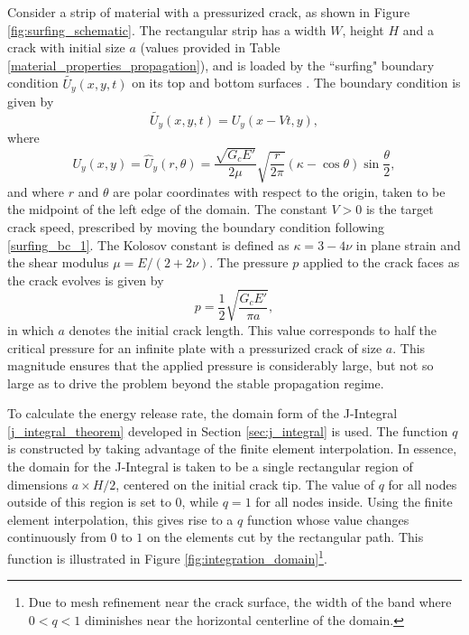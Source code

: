 
Consider a strip of material with a pressurized crack, as shown in  Figure \ref{fig:surfing_schematic}.
The rectangular strip has a width $W$, height $H$ and a crack with initial size $a$ (values provided in Table \ref{material_properties_propagation}), and is loaded by the ``surfing" boundary condition $\widetilde{U_y}(x,y,t)$ on its top and bottom surfaces \cite{hossain2014effective}. The boundary condition is given by
\begin{equation}\label{surfing_bc_1}
    \widetilde{U_y}(x,y,t) = U_y(x-Vt,y),  
\end{equation}
where
\begin{equation}\label{surfing_bc_2}
    U_y(x,y) = \hat{U}_y(r,\theta) = \dfrac{\sqrt{G_cE'}}{2\mu}\sqrt{\dfrac{r}{2\pi}}(\kappa - \cos\theta)\sin\dfrac{\theta}{2},
\end{equation}
and where $r$ and $\theta$ are polar coordinates with respect to the origin, taken to be the midpoint of the left edge of the domain. The constant $V>0$ is the target crack speed, prescribed by moving the boundary condition following \eqref{surfing_bc_1}. The Kolosov constant is defined as $\kappa = 3-4\nu$ in plane strain and the shear modulus $\mu = E/(2+2\nu)$. The pressure $p$ applied to the crack faces as the crack evolves is given by
\begin{equation}
    p = \dfrac{1}{2}\sqrt{\dfrac{G_cE'}{\pi a}},
\end{equation}
 in which $a$ denotes the initial crack length. This value corresponds to half the critical pressure for an infinite plate with a pressurized crack of size $a$. This magnitude ensures that the applied pressure is considerably large, but not so large as to drive the problem beyond the stable propagation regime. 
 
 To calculate the energy release rate, the domain form of the J-Integral \eqref{j_integral_theorem} developed in Section \ref{sec:j_integral} is used. The function $q$ is constructed by taking advantage of the finite element interpolation. In essence, the domain for the J-Integral is taken to be a single rectangular region of dimensions $a \times H/2$, centered on the initial crack tip. The value of $q$ for all nodes outside of this region is set to $0$, while $q = 1$ for all nodes inside. Using the finite element interpolation, this gives rise to a $q$ function whose value changes continuously from $0$ to $1$ on the elements cut by the rectangular path. This function is illustrated in Figure \ref{fig:integration_domain}\footnote{Due to mesh refinement near the crack surface, the width of the band where $0 < q < 1$ diminishes near the horizontal centerline of the domain.}.

